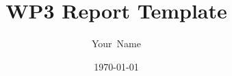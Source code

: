 \documentclass[11pt,a4paper]{article}
\title{WP3 Report Template}
\author{Your~Name}
\date{\today}
\begin{document}
\makecustomtitle




\nocite{*} %
\printbibliography
\end{document}
